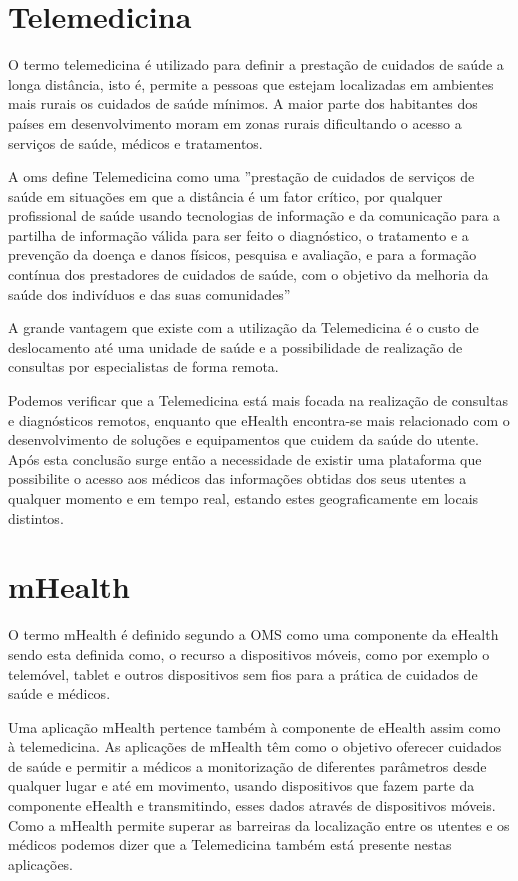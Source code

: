 \section{Telemedicina}

O termo telemedicina \'e utilizado para definir a presta\c c\~ao de cuidados de sa\'ude a longa dist\^ancia, isto \'e, permite a pessoas que estejam localizadas em ambientes mais rurais os cuidados de sa\'ude m\'inimos. A maior parte dos habitantes dos pa\'ises em desenvolvimento moram em zonas rurais dificultando o acesso a servi\c cos de sa\'ude, m\'edicos e tratamentos.

A \gls{oms} define Telemedicina como \cite{ehealth_telemedicine} uma ''presta\c c\~ao de cuidados de servi\c cos de sa\'ude em situa\c c\~oes em que a dist\^ancia \'e um fator cr\'itico, por qualquer profissional de sa\'ude usando tecnologias de informa\c c\~ao e da comunica\c c\~ao para a partilha de informa\c c\~ao v\'alida para ser feito o diagn\'ostico, o tratamento e a preven\c c\~ao da doen\c ca e danos f\'isicos, pesquisa e avalia\c c\~ao, e para a forma\c c\~ao cont\'inua dos prestadores de cuidados de sa\'ude, com o objetivo da melhoria da sa\'ude dos indiv\'iduos e das suas comunidades''
\par
A grande vantagem que existe com a utiliza\c c\~ao da Telemedicina \'e o custo de deslocamento at\'e uma unidade de sa\'ude e a possibilidade de realiza\c c\~ao de consultas por especialistas de forma remota.
\par
Podemos verificar que a Telemedicina est\'a mais focada na realiza\c c\~ao de consultas e diagn\'osticos remotos, enquanto que eHealth encontra-se mais relacionado com o desenvolvimento de solu\c c\~oes e equipamentos que cuidem da sa\'ude do utente. Ap\'os esta conclus\~ao surge ent\~ao a necessidade de existir uma plataforma que possibilite o acesso aos m\'edicos das informa\c c\~oes obtidas dos seus utentes a qualquer momento e em tempo real, estando estes geograficamente em locais distintos.

\section{mHealth}

O termo \gls{mHealth} \'e definido segundo a OMS como uma componente da eHealth \cite{mhealth_oms} sendo esta definida como, o recurso a dispositivos m\'oveis, como por exemplo o telem\'ovel, tablet e outros dispositivos sem fios para a pr\'atica de cuidados de sa\'ude e m\'edicos.
\par
Uma aplica\c c\~ao mHealth pertence tamb\'em \`a componente de eHealth assim como \`a telemedicina. As aplica\c c\~oes de mHealth t\^em como o objetivo oferecer cuidados de sa\'ude e permitir a m\'edicos a monitoriza\c c\~ao de diferentes par\^ametros desde qualquer lugar e at\'e em movimento, usando dispositivos que fazem parte da componente eHealth e transmitindo, esses dados atrav\'es de dispositivos m\'oveis. 
Como a mHealth permite superar as barreiras da localiza\c c\~ao entre os utentes e os m\'edicos podemos dizer que a Telemedicina tamb\'em est\'a presente nestas aplica\c c\~oes.

